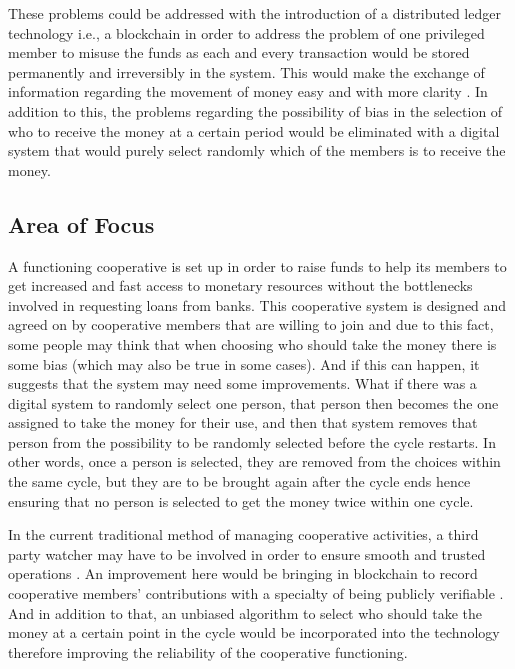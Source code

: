 \documentclass{article}
\begin{document}
These problems could be addressed with the introduction of a distributed ledger technology i.e., a blockchain in order to address the problem of one privileged member to misuse the funds as each and every transaction would be stored permanently and irreversibly in the system. This would make the exchange of information regarding the movement of money easy and with more clarity \cite{rodrigues2019evaluating}. In addition to this, the problems regarding the possibility of bias in the selection of who to receive the money at a certain period would be eliminated with a digital system that would purely select randomly which of the members is to receive the money.

\subsection{Area of Focus}
A functioning cooperative is set up in order to raise funds to help its members to get increased and fast access to monetary resources without the bottlenecks involved in requesting loans from banks. This cooperative system is designed and agreed on by cooperative members that are willing to join and due to this fact, some people may think that when choosing who should take the money there is some bias (which may also be true in some cases). And if this can happen, it suggests that the system may need some improvements. What if there was a digital system to randomly select one person, that person then becomes the one assigned to take the money for their use, and then that system removes that person from the possibility to be randomly selected before the cycle restarts. In other words, once a person is selected, they are removed from the choices within the same cycle, but they are to be brought again after the cycle ends hence ensuring that no person is selected to get the money twice within one cycle.

In the current traditional method of managing cooperative activities, a third party watcher may have to be involved in order to ensure smooth and trusted operations \cite{nair2018blockchain}. An improvement here would be bringing in blockchain to record cooperative members’ contributions with a specialty of being publicly verifiable \cite{nair2018blockchain}. And in addition to that, an unbiased algorithm to select who should take the money at a certain point in the cycle would be incorporated into the technology therefore improving the reliability of the cooperative functioning. 
\end{document}
